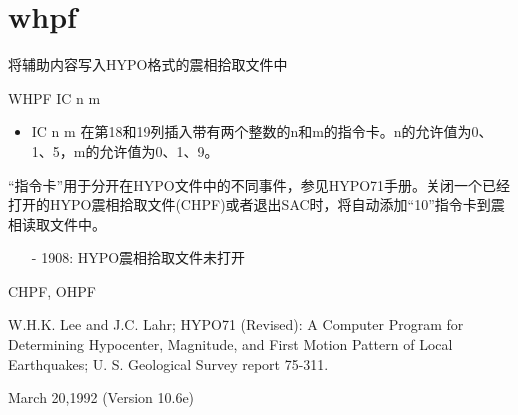 \section{whpf}
\label{cmd:whpf}

将辅助内容写入HYPO格式的震相拾取文件中

WHPF IC n m

\begin{itemize}
\item IC n m  在第18和19列插入带有两个整数的n和m的指令卡。n的允许值为0、1、5，m的允许值为0、1、9。
\end{itemize}

``指令卡''用于分开在HYPO文件中的不同事件，参见HYPO71手册。关闭一个已经打开的HYPO震相拾取文件(CHPF)或者退出SAC时，将自动添加``10''指令卡到震相读取文件中。

\begin{itemize}
\item[-]1908: HYPO震相拾取文件未打开
\end{itemize}

CHPF, OHPF

W.H.K. Lee and J.C. Lahr; HYPO71 (Revised): A Computer Program for Determining 	Hypocenter, Magnitude, and First Motion Pattern of Local Earthquakes; U. S. Geological 	Survey report 75-311.

March 20,1992 (Version 10.6e)
